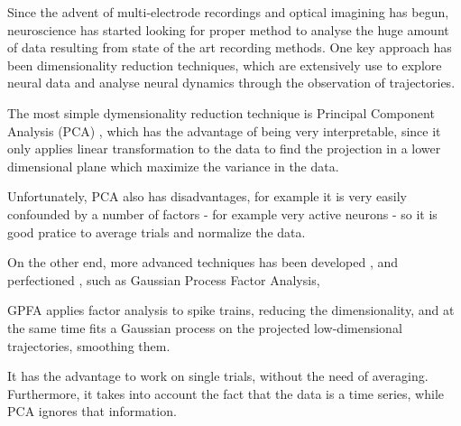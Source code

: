 Since the advent of multi-electrode recordings and optical imagining has begun, neuroscience has started looking for proper method to analyse the huge amount of data resulting from state of the art recording methods.
One key approach has been dimensionality reduction techniques, which are extensively use to explore neural data and analyse neural dynamics through the observation of trajectories.

The most simple dymensionality reduction technique is Principal Component Analysis (PCA) , which has the advantage of being very interpretable, since it only applies linear transformation to the data to find the projection in a lower dimensional plane which maximize the variance in the data.

Unfortunately, PCA also has disadvantages, for example it is very easily confounded by a number of factors - for example very active neurons - so it is good pratice to average trials and normalize the data.

On the other end, more advanced techniques has been developed \cite{byron2009gaussian}, and perfectioned \cite{luttinen2009variational}, such as Gaussian Process Factor Analysis, 

GPFA applies factor analysis to spike trains, reducing the dimensionality, and at the same time fits a Gaussian process on the projected low-dimensional trajectories, smoothing them.

It has the advantage to work on single trials, without the need of averaging. Furthermore, it takes into account the fact that the data is a time series, while PCA ignores that information.
